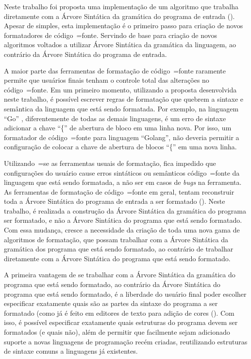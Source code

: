 Neste trabalho foi proposta uma implementação de um algoritmo que trabalha diretamente com a Árvore Sintática da gramática do programa de entrada ().
Apesar de simples,
esta implementação é o primeiro passo para criação de novos formatadores de código~=fonte.
Servindo de base para criação de novos algoritmos voltados a utilizar Árvore Sintática da gramática da linguagem,
ao contrário da Árvore Sintática do programa de entrada.

A maior parte das ferramentas de formatação de código~=fonte raramente permite que usuários finais tenham o controle total das alterações no código~=fonte.
Em um primeiro momento,
utilizando a proposta desenvolvida neste trabalho,
é possível escrever regras de formatação que quebrem a sintaxe e
semântica da linguagem que está sendo formatada.
Por exemplo,
na linguagem ``Go'' \cite{programmingLanguageGolang},
diferentemente de todas as demais linguagens,
é um erro de sintaxe adicionar a chave ``\{'' de abertura de bloco em uma linha nova.
Por isso,
um formatador de código~=fonte para linguagem ``Golang'',
não deveria permitir a configuração de colocar a chave de abertura de blocos ``\{'' em uma nova linha.

Utilizando~=se as ferramentas usuais de formatação,
fica impedido que configurações do usuário cause erros sintáticos ou
semânticos código~=fonte da linguagem que está sendo formatada,
a não ser em casos de \textit{bugs} na ferramenta.
As ferramentas de formatação de código~=fonte em geral,
tentam reconstruir toda a Árvore Sintática do programa de entrada a ser formatado ().
Neste trabalho,
é realizada a construção da Árvore Sintática da gramática do programa ser formatado,
e não a Árvore Sintática do programa que está sendo formatado.
Com essa mudança,
cresce a necessidade da criação de toda uma nova gama de algoritmos de formatação,
que possam trabalhar com a Árvore Sintática da gramática dos programa que está sendo formatado,
ao contrário de trabalhar diretamente com a Árvore Sintática do programa que está sendo formatado.

A primeira vantagem de se trabalhar com a Árvore Sintática da gramática do programa que está sendo formatado,
ao contrário da Árvore Sintática do programa que está sendo formatado,
é a liberdade do usuário final poder escolher especificar exatamente quais são as partes da sintaxe do programa a ser formatado (como já é feito em editores de texto para adição de cores ().
Com isso,
é possível especificar exatamente quais estruturas do programa devem ser formatados (e quais não),
além de permitir que facilmente sejam adicionado suporte a novas linguagens de programação recém criadas,
reutilizando estruturas de sintaxe comuns a linguagens já existentes.


